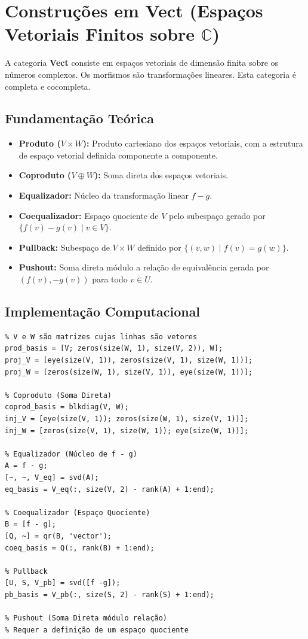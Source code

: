 \section{Construções em Vect (Espaços Vetoriais Finitos sobre $\mathbb{C}$)}

A categoria \textbf{Vect} consiste em espaços vetoriais de dimensão finita sobre os números complexos. Os morfismos são transformações lineares. Esta categoria é completa e cocompleta.

\subsection{Fundamentação Teórica}
\begin{itemize}
    \item \textbf{Produto ($V \times W$):} Produto cartesiano dos espaços vetoriais, com a estrutura de espaço vetorial definida componente a componente.
    \item \textbf{Coproduto ($V \oplus W$):} Soma direta dos espaços vetoriais.
    \item \textbf{Equalizador:} Núcleo da transformação linear $f - g$.
    \item \textbf{Coequalizador:} Espaço quociente de $V$ pelo subespaço gerado por $\{f(v) - g(v) \mid v \in V\}$.
    \item \textbf{Pullback:} Subespaço de $V \times W$ definido por $\{(v, w) \mid f(v) = g(w)\}$.
    \item \textbf{Pushout:} Soma direta módulo a relação de equivalência gerada por $(f(v), -g(v))$ para todo $v \in U$.
\end{itemize}

\subsection{Implementação Computacional}
\begin{lstlisting}[caption={Construções Universais em Vect}]
% Produto e Projeções
% V e W são matrizes cujas linhas são vetores
prod_basis = [V; zeros(size(W, 1), size(V, 2)), W];
proj_V = [eye(size(V, 1)), zeros(size(V, 1), size(W, 1))];
proj_W = [zeros(size(W, 1), size(V, 1)), eye(size(W, 1))];

% Coproduto (Soma Direta)
coprod_basis = blkdiag(V, W);
inj_V = [eye(size(V, 1)); zeros(size(W, 1), size(V, 1))];
inj_W = [zeros(size(V, 1), size(W, 1)); eye(size(W, 1))];

% Equalizador (Núcleo de f - g)
A = f - g;
[~, ~, V_eq] = svd(A);
eq_basis = V_eq(:, size(V, 2) - rank(A) + 1:end);

% Coequalizador (Espaço Quociente)
B = [f - g];
[Q, ~] = qr(B, 'vector');
coeq_basis = Q(:, rank(B) + 1:end);

% Pullback
[U, S, V_pb] = svd([f -g]);
pb_basis = V_pb(:, size(S, 2) - rank(S) + 1:end);

% Pushout (Soma Direta módulo relação)
% Requer a definição de um espaço quociente
\end{lstlisting}